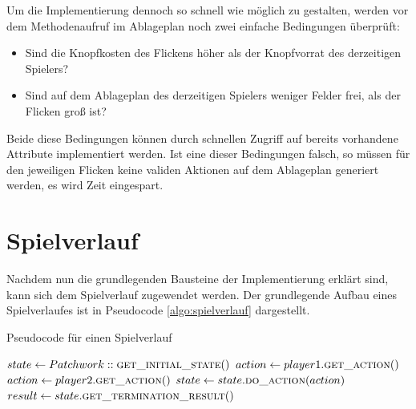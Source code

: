 Um die Implementierung dennoch so schnell wie möglich zu gestalten, werden vor dem Methodenaufruf im Ablageplan noch zwei einfache Bedingungen überprüft:

\begin{itemize}
    \item Sind die Knopfkosten des Flickens höher als der Knopfvorrat des derzeitigen Spielers?
    \item Sind auf dem Ablageplan des derzeitigen Spielers weniger Felder frei, als der Flicken groß ist?
\end{itemize}

Beide diese Bedingungen können durch schnellen Zugriff auf bereits vorhandene Attribute implementiert werden. Ist eine dieser Bedingungen falsch, so müssen für den jeweiligen Flicken keine validen Aktionen auf dem Ablageplan generiert werden, \dash es wird Zeit eingespart.

\section{Spielverlauf}

Nachdem nun die grundlegenden Bausteine der Implementierung erklärt sind, kann sich dem Spielverlauf zugewendet werden. Der grundlegende Aufbau eines Spielverlaufes ist in Pseudocode \ref{algo:spielverlauf} dargestellt.


\begin{algorithm}
    \caption{Pseudocode für einen Spielverlauf}
    \label{algo:spielverlauf}
    \begin{algorithmic}[1]
        \State $state \gets Patchwork::\Call{get\_initial\_state}$
        \State $action \gets player1.\Call{get\_action}$
        \Else
        \State $action \gets player2.\Call{get\_action}$
        \EndIf
        \State $state \gets state.\Call{do\_action}{action}$
        \EndWhile
        \State $result \gets state.\Call{get\_termination\_result}$
        \EndFunction
    \end{algorithmic}
\end{algorithm}

